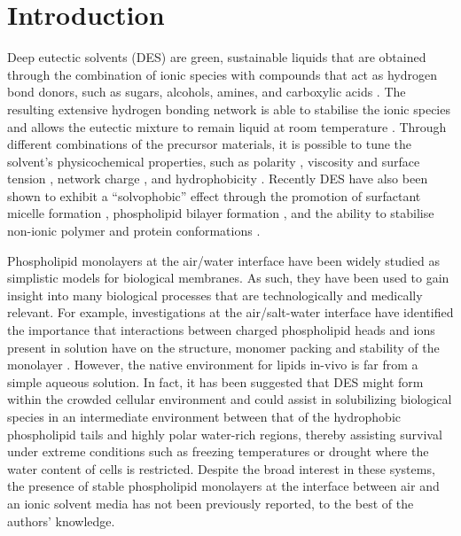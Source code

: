 \documentclass[amsmath,amssymb,twocolumn,superscriptaddress]{revtex4-1}
\begin{document}
\section{Introduction}
%
Deep eutectic solvents (DES) are green, sustainable liquids that are obtained through the combination of ionic species with compounds that act as hydrogen bond donors, such as sugars, alcohols, amines, and carboxylic acids \cite{smith_deep_2014,dai_natural_2013}.
The resulting extensive hydrogen bonding network is able to stabilise the ionic species and allows the eutectic mixture to remain liquid at room temperature \cite{hammond_liquid_2016,hammond_resilience_2017,araujo_inelastic_2017}.
Through different combinations of the precursor materials, it is possible to tune the solvent's physicochemical properties, such as polarity \cite{pandey_how_2014}, viscosity and surface tension \cite{smith_deep_2014}, network charge \cite{zahn_charge_2016}, and hydrophobicity \cite{ribeiro_menthol-based_2015,van_osch_hydrophobic_2015}.
Recently DES have also been shown to exhibit a ``solvophobic'' effect through the promotion of surfactant micelle formation \cite{sanchez-fernandez_micellization_2016,arnold_surfactant_2015,hsieh_micelle_2018,banjare_self-assembly_2018}, phospholipid bilayer formation \cite{bryant_effect_2017,bryant_spontaneous_2016,gutierrez_freeze-drying_2009}, and the ability to stabilise non-ionic polymer \cite{sapir_properties_2016} and protein conformations \cite{sanchez-fernandez_protein_2017}.

Phospholipid monolayers at the air/water interface have been widely studied as simplistic models for biological membranes.
As such, they have been used to gain insight into many biological processes that are technologically and medically relevant.
For example, investigations at the air/salt-water interface have identified the importance that interactions between charged phospholipid heads and ions present in solution have on the structure, monomer packing and stability of the monolayer \cite{mohwald_phospholipid_1990,kewalramani_effects_2010}.
However, the native environment for lipids in-vivo is far from a simple aqueous solution.
In fact, it has been suggested \cite{dai_natural_2013,hammond_resilience_2017} that DES might form within the crowded cellular environment and could assist in solubilizing biological species in an intermediate environment between that of the hydrophobic phospholipid tails and highly polar water-rich regions, thereby assisting survival under extreme conditions such as freezing temperatures or drought where the water content of cells is restricted.
Despite the broad interest in these systems, the presence of stable phospholipid monolayers at the interface between air and an ionic solvent media has not been previously reported, to the best of the authors' knowledge.
\end{document}
